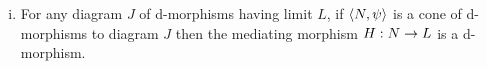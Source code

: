 \documentclass[10pt,a4paper]{article}
\begin{document}
\begin{enumerate} [(i)]
\noindent then
$B_2[b_1|b_2]=B_1[b_2|b_1]$ and $q(b_1,b_2)= b_2\sub b_1 $ and $q(b_2,b_1)= b_1 \sub b_2$
\noindent
so that we have:

\begin{center}
$
\begin{array}{ccc}
               & \Rnode{X}{B_2[b_1|b_2]=B_1[b_2|b_1]}&                \\ [1.2cm]
\Rnode{B1}{B_1}&                                     &\Rnode{B2}{B_2} \\ [1.2cm]
               & \Rnode{A}{A}                        & 
\end{array}
$
\end{center}



\item For any diagram $J$ of d-morphisms having limit $L$, if $\left\langle N,\psi\right\rangle$ is a cone of d-morphisms 
to diagram $J$ then the mediating morphism $H:N \rightarrow L$ is a d-morphism.
\end{enumerate}
 


\end{document}
